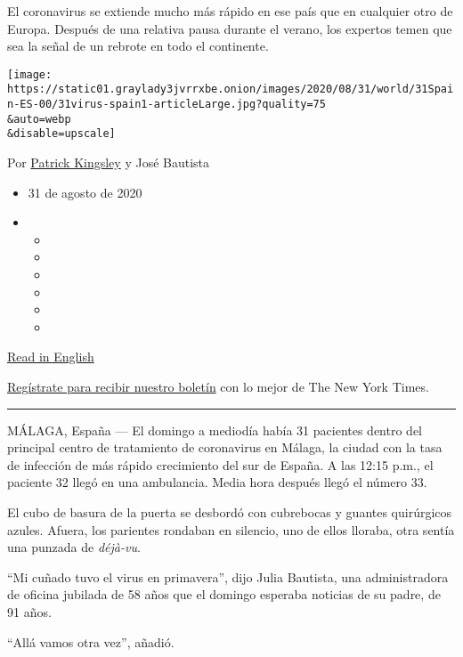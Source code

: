 El coronavirus se extiende mucho más rápido en ese país que en cualquier
otro de Europa. Después de una relativa pausa durante el verano, los
expertos temen que sea la señal de un rebrote en todo el continente.

\texttt{[image: https://static01.graylady3jvrrxbe.onion/images/2020/08/31/world/31Spain-ES-00/31virus-spain1-articleLarge.jpg?quality=75\\\&auto=webp\\\&disable=upscale]}

Por
\href{https://www.nytimes3xbfgragh.onion/by/patrick-kingsley}{Patrick
Kingsley} y José Bautista

\begin{itemize}
\item
  31 de agosto de 2020
\item
  \begin{itemize}
  \item
  \item
  \item
  \item
  \item
  \item
  \end{itemize}
\end{itemize}

\href{https://www.nytimes3xbfgragh.onion/2020/08/31/world/europe/coronavirus-covid-spain-second-wave.html}{Read
in English}

\href{https://www.nytimes3xbfgragh.onion/newsletters/el-times}{Regístrate
para recibir nuestro boletín} con lo mejor de The New York Times.

\begin{center}\rule{0.5\linewidth}{\linethickness}\end{center}

MÁLAGA, España --- El domingo a mediodía había 31 pacientes dentro del
principal centro de tratamiento de coronavirus en Málaga, la ciudad con
la tasa de infección de más rápido crecimiento del sur de España. A las
12:15 p.m., el paciente 32 llegó en una ambulancia. Media hora después
llegó el número 33.

El cubo de basura de la puerta se desbordó con cubrebocas y guantes
quirúrgicos azules. Afuera, los parientes rondaban en silencio, uno de
ellos lloraba, otra sentía una punzada de \emph{déjà-vu}.

``Mi cuñado tuvo el virus en primavera'', dijo Julia Bautista, una
administradora de oficina jubilada de 58 años que el domingo esperaba
noticias de su padre, de 91 años.

``Allá vamos otra vez'', añadió.

